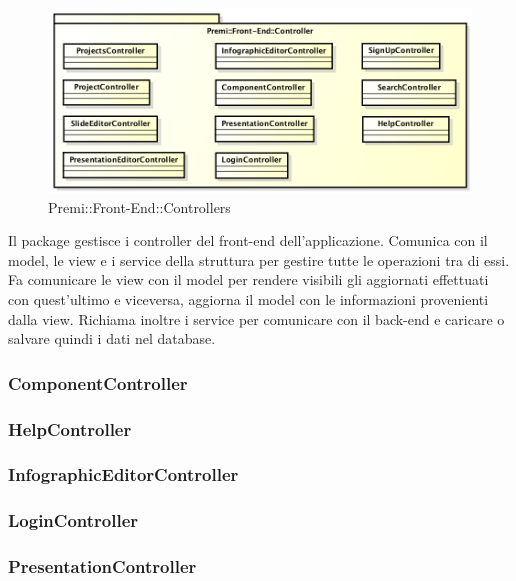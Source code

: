 \begin{figure}[h]
	\centering
	\includegraphics[width=0.7\linewidth]{img/premi_front_end_controllers}
	\caption[Premi::Front-End::Controllers]{Premi::Front-End::Controllers}
\end{figure}
Il package gestisce i controller del front-end dell'applicazione. Comunica con il model, le view e i service della struttura per gestire tutte le operazioni tra di essi. Fa comunicare le view con il model per rendere visibili gli aggiornati effettuati con quest'ultimo e viceversa, aggiorna il model con le informazioni provenienti dalla view. Richiama inoltre i service per comunicare con il back-end e caricare o salvare quindi i dati nel database.
\newpage

\subsubsection{ComponentController}

\subsubsection{HelpController}

\subsubsection{InfographicEditorController}

\subsubsection{LoginController}

\subsubsection{PresentationController}

